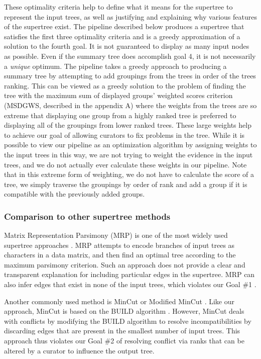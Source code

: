 \documentclass[fleqn,12pt,lineno,english]{wlpeerj}
\begin{document}
These optimality criteria help to define what it means for the supertree
to represent the input trees, as well as justifying and explaining
why various features of the supertree exist. The pipeline described
below produces a supertree that satisfies the first three optimality
criteria and is a greedy approximation of a solution to the fourth
goal. It is not guaranteed to display as many input nodes as possible.
Even if the summary tree does accomplish goal 4, it is not necessarily
a \emph{unique} optimum. The pipeline takes a greedy approach to producing
a summary tree by attempting to add groupings from the trees in order
of the trees ranking. This can be viewed as a greedy solution to the
problem of finding the tree with the maximum sum of displayed groups'
weighted scores criterion (MSDGWS, described in the appendix A) where the
weights from the trees are so extreme that displaying one group from
a highly ranked tree is preferred to displaying all of the groupings
from lower ranked trees.  These large weights help to achieve our goal of allowing curators to fix problems in the tree.  While it is possible to view our pipeline as an optimization algorithm by assigning weights to the input trees in this way, we are not trying to weight the evidence in the input trees, and we do not actually ever calculate these weights in our pipeline.
Note that in this extreme form of weighting, we do not have to calculate
the score of a tree, we simply traverse the groupings by order of rank
and add a group if it is compatible with the previously added groups.

\subsubsection{Comparison to other supertree methods}

Matrix Representation Parsimony (MRP) is one of the
most widely used supertree approaches \citep{baum1992combining,BinindaEmonds2007b,Davis2014}.
MRP attempts to encode branches of input trees as characters in a data
matrix, and then find an optimal tree according to the maximum
parsimony criterion. Such an approach does not provide a clear and transparent
explanation for including particular edges in the supertree.
MRP can also infer edges that exist in none of the input trees, which 
violates our Goal \#1 \citep{gatesy2004critique}.

Another commonly used method is MinCut \citep{semple2000supertree} or
Modified MinCut \citep{page2002modified}.  Like our approach, MinCut
is based on the BUILD algorithm \citep{AhoSSU1981}.  However, MinCut deals
with conflicts by modifying the BUILD algorithm to resolve
incompatibilities by discarding edges that are present in the smallest 
number of input trees.  This approach thus violates our Goal \#2 of
resolving conflict via ranks that can be altered by a curator to
influence the output tree.
\end{document}
